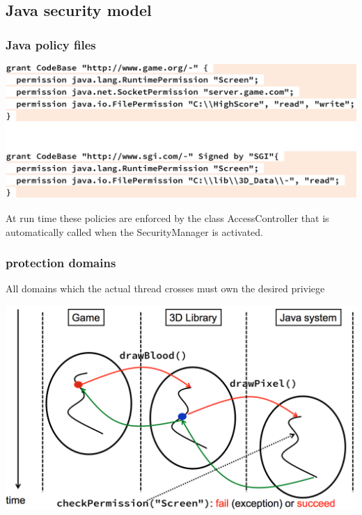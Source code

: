 \documentclass[10pt]{article}
\begin{document}
\subsection{Java security model}
\subsubsection{Java policy files}
\begin{center}
	\includegraphics[scale=0.2]{policy-files.png}
\end{center}
At run time these policies are enforced by the class AccessController that is automatically called when the SecurityManager is activated.
\subsubsection{protection domains}
All domains which the actual thread crosses must own the desired priviege
\begin{center}
	\includegraphics[scale=0.2]{protection-domain.png}
\end{center}
\end{document}
